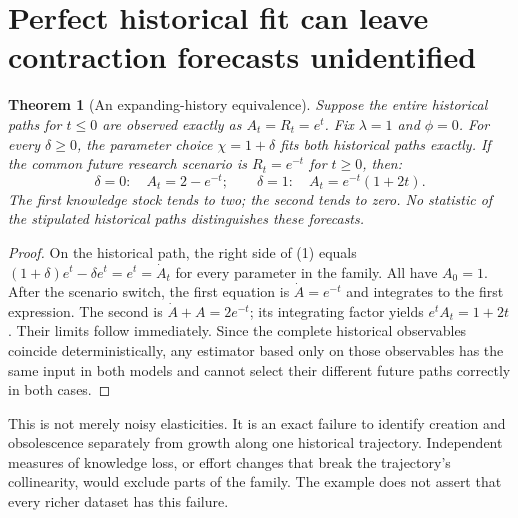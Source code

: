 \documentclass[11pt]{article}
\newtheorem{theorem}{Theorem}
\theoremstyle{definition}
\begin{document}
\section*{Perfect historical fit can leave contraction forecasts unidentified}
\begin{theorem}[An expanding-history equivalence]
Suppose the entire historical paths for $t\le0$ are observed exactly as $A_t=R_t=e^t$. Fix $\lambda=1$ and $\phi=0$. For every $\delta\ge0$, the parameter choice $\chi=1+\delta$ fits both historical paths exactly. If the common future research scenario is $R_t=e^{-t}$ for $t\ge0$, then:
\[
 \delta=0:\quad A_t=2-e^{-t};\qquad
 \delta=1:\quad A_t=e^{-t}(1+2t).
\]
The first knowledge stock tends to two; the second tends to zero. No statistic of the stipulated historical paths distinguishes these forecasts.
\end{theorem}
\begin{proof}
On the historical path, the right side of (1) equals $(1+\delta)e^t-\delta e^t=e^t=\dot A_t$ for every parameter in the family. All have $A_0=1$. After the scenario switch, the first equation is $\dot A=e^{-t}$ and integrates to the first expression. The second is $\dot A+A=2e^{-t}$; its integrating factor yields $e^tA_t=1+2t$. Their limits follow immediately. Since the complete historical observables coincide deterministically, any estimator based only on those observables has the same input in both models and cannot select their different future paths correctly in both cases.
\end{proof}
This is not merely noisy elasticities. It is an exact failure to identify creation and obsolescence separately from growth along one historical trajectory. Independent measures of knowledge loss, or effort changes that break the trajectory's collinearity, would exclude parts of the family. The example does not assert that every richer dataset has this failure.
\end{document}
